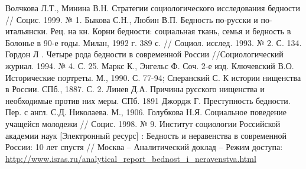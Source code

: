 \pagebreak
\renewcommand{\bibname}{Список литературы}
\begin{thebibliography}{99}
     Волчкова Л.Т., Минина В.Н. Стратегии социологического 
        исследования бедности // Социс. 1999. № 1.
     Быкова С.Н., Любин В.П. Бедность по-русски и 
        по-итальянски. Рец. на кн. Корни бедности: социальная ткань, семья и 
        бедность в Болонье в 90-е годы. Милан, 1992 г. 389 с. 
        // Социол. исслед. 1993. № 2. С. 134.
     Гордон Л . Четыре рода бедности в современной 
        России //Социологический журнал. 1994. № 4. С. 25.
     Маркс К., Энгельс Ф. Соч. 2-е изд.
     Ключевский В.О. Исторические портреты. М., 1990. С. 
        77-94; Сперанский С. К истории нищенства в России. СПб., 1887. С. 2.
     Линев Д.А. Причины русского нищенства и необходимые 
        против них меры. СПб. 1891
     Джордж Г. Преступность бедности. Пер. с англ. С.Д. 
        Николаева. М., 1906.
     Голубкова Н.Я. Социальное поведение учащейся молодежи 
        // Социс. 1998. № 9.
     Институт социологии Российской академии наук 
        [Электронный ресурс] : Бедность и неравенства в современной России: 
        10 лет спустя // Москва -- Аналитический доклад -- Режим доступа: 
        \url{http://www.isras.ru/analytical_report_bednost_i_neravenstva.html} 
\end{thebibliography}